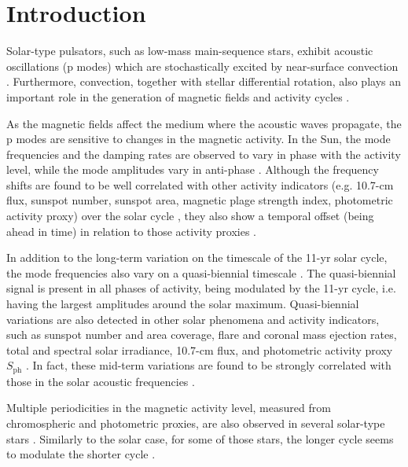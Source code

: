 \documentclass[twocolumn]{aastex61}%
\begin{document}
\section{Introduction} \label{sec:intro}

Solar-type pulsators, such as low-mass main-sequence stars, exhibit acoustic oscillations (p modes) which are stochastically excited by near-surface convection \citep [e.g.][]{Goldreich1977}. Furthermore, convection, together with stellar differential rotation, also plays an important role in the generation of magnetic fields and activity cycles \citep[e.g.][]{Brun2017}.

As the magnetic fields affect the medium where the acoustic waves propagate, the p modes are sensitive to changes in the magnetic activity. In the Sun, the mode frequencies and the damping rates are observed to vary in phase with the activity level, while the mode amplitudes vary in anti-phase \citep[e.g.][]{Woodard1985,Elsworth1990,Libbrecht1990a,Chaplin1998,Howe2015}. Although the frequency shifts are found to be well correlated with other activity indicators (e.g. 10.7-cm flux, sunspot number, sunspot area, magnetic plage strength index, photometric activity proxy) over the solar cycle \citep[e.g.][]{Chaplin2007,Tripathy2007,Jain2009,Broomhall2015,Santos2016,Santos2017,Salabert2017}, they also show a temporal offset (being ahead in time) in relation to those activity proxies \citep[e.g.][]{Jimenez-Reyes1998,Moreno-Insertis2000,Jain2009,Salabert2009,Salabert2015}.

In addition to the long-term variation on the timescale of the 11-yr solar cycle, the mode frequencies also vary on a quasi-biennial timescale \citep[e.g.][]{Fletcher2010,Broomhall2012,Simoniello2012,Simoniello2013,Salabert2015,Broomhall2015}. The quasi-biennial signal is present in all phases of activity, being modulated by the 11-yr cycle, i.e. having the largest amplitudes around the solar maximum. 
Quasi-biennial variations are also detected in other solar phenomena and activity indicators, such as sunspot number and area coverage, flare and coronal mass ejection rates, total and spectral solar irradiance, 10.7-cm flux, and photometric activity proxy $S_\text{ph}$ \citep[e.g.][]{Bazilevskaya2014,McIntosh2015,Salabert2017}. In fact, these mid-term variations are found to be strongly correlated with those in the solar acoustic frequencies \citep{Broomhall2012,Broomhall2015}. 

Multiple periodicities in the magnetic activity level, measured from chromospheric and photometric proxies, are also observed in several solar-type stars \citep[e.g.][]{Baliunas1995,Olah2009,Metcalfe2010,Metcalfe2013,Egeland2015,Flores2016}.
Similarly  to the solar case, for some of those stars, the longer cycle seems to modulate the shorter cycle \citep{Olah2009,Metcalfe2013}. 
\end{document}
